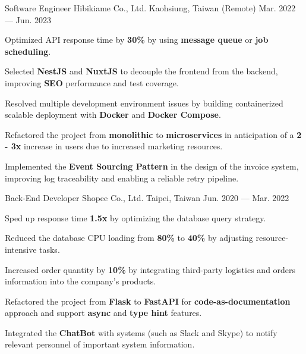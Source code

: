 \begin{cventries}
  \cventry
    {Software Engineer } %
    {Hibikiame Co., Ltd.} %
    {Kaohsiung, Taiwan (Remote)} %
    {Mar. 2022 --- Jun. 2023} %
    {
      \begin{cvitems} %
        \item {Optimized API response time by \textbf{30\%} by using \textbf{message queue} or \textbf{job scheduling}.}
        \item {Selected \textbf{NestJS} and \textbf{NuxtJS} to decouple the frontend from the backend, improving \textbf{SEO} performance and test coverage.}
        \item {Resolved multiple development environment issues by building containerized scalable deployment with \textbf{Docker} and \textbf{Docker Compose}.}
        \item {Refactored the project from \textbf{monolithic} to \textbf{microservices} in anticipation of a \textbf{2 - 3x} increase in users due to increased marketing resources.}
        \item {Implemented the \textbf{Event Sourcing Pattern} in the design of the invoice system, improving log traceability and enabling a reliable retry pipeline.}
      \end{cvitems}
    }

  \cventry
    {Back-End Developer } %
    {Shopee Co., Ltd.} %
    {Taipei, Taiwan} %
    {Jun. 2020 --- Mar. 2022} %
    {
      \begin{cvitems} %
        \item {Sped up response time \textbf{1.5x} by optimizing the database query strategy.}
        \item {Reduced the database CPU loading from \textbf{80\%} to \textbf{40\%} by adjusting resource-intensive tasks.}
        \item {Increased order quantity by \textbf{10\%} by integrating third-party logistics and orders information into the company's products.}
        \item {Refactored the project from \textbf{Flask} to \textbf{FastAPI} for \textbf{code-as-documentation} approach and support \textbf{async} and \textbf{type hint} features.}
        \item {Integrated the \textbf{ChatBot} with systems (such as Slack and Skype) to notify relevant personnel of important system information.}
      \end{cvitems}
    }


\end{cventries}
